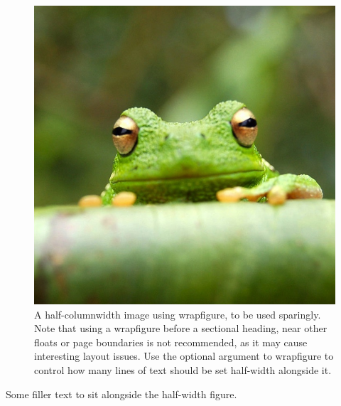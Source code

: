 \documentclass[9pt,lineno]{elife}
\begin{document}
\begin{figure}
\includegraphics[width=\hsize]{frog}
\caption{A half-columnwidth image using wrapfigure, to be used sparingly. Note that using a wrapfigure before a sectional heading, near other floats or page boundaries is not recommended, as it may cause interesting layout issues. Use the optional argument to wrapfigure to control how many lines of text should be set half-width alongside it.}
\label{fig:halfwidth}
\end{figure}

Some filler text to sit alongside the half-width figure. \lipsum[1-2]
\end{document}
